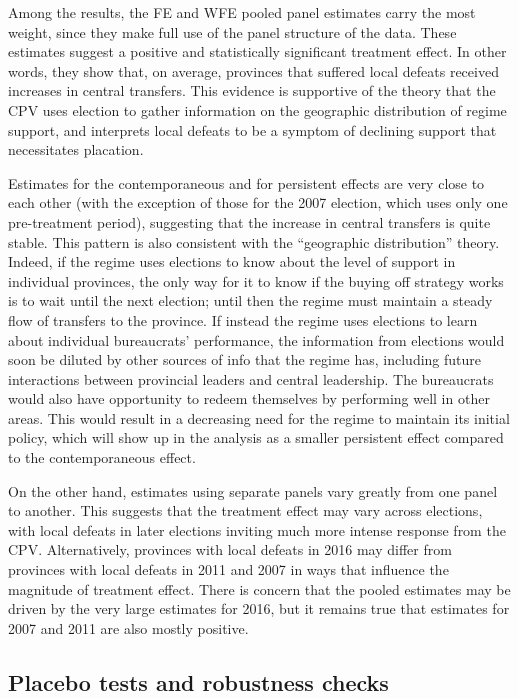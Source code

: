 \documentclass[12pt]{article}\usepackage[]{graphicx}\usepackage[]{color}
\newcommand{\1}{\mathbbm{1}}
\begin{document}
Among the results, the FE and WFE pooled panel estimates carry the most weight, since they make full use of the panel structure of the data. These estimates suggest a positive and statistically significant treatment effect. In other words, they show that, on average, provinces that suffered local defeats received increases in central transfers. This evidence is supportive of the theory that the CPV uses election to gather information on the geographic distribution of regime support, and interprets local defeats to be a symptom of declining support that necessitates placation.

Estimates for the contemporaneous and for persistent effects are very close to each other (with the exception of those for the 2007 election, which uses only one pre-treatment period), suggesting that the increase in central transfers is quite stable. This pattern is also consistent with the ``geographic distribution'' theory. Indeed, if the regime uses elections to know about the level of support in individual provinces, the only way for it to know if the buying off strategy works is to wait until the next election; until then the regime must maintain a steady flow of transfers to the province.  If instead the regime uses elections to learn about individual bureaucrats' performance, the information from elections would soon be diluted by other sources of info that the regime has, including future interactions between provincial leaders and central leadership. The bureaucrats would also have opportunity to redeem themselves by performing well in other areas. This would result in a decreasing need for the regime to maintain its initial policy, which will show up in the analysis as a smaller persistent effect compared to the contemporaneous effect.

On the other hand, estimates using separate panels vary greatly from one panel to another. This suggests that the treatment effect may vary across elections, with local defeats in later elections inviting much more intense response from the CPV. Alternatively, provinces with local defeats in 2016 may differ from provinces with local defeats in 2011 and 2007 in ways that influence the magnitude of treatment effect. There is concern that the pooled estimates may be driven by the very large estimates for 2016, but it remains true that estimates for 2007 and 2011 are also mostly positive.

\subsection{Placebo tests and robustness checks}
\end{document}
